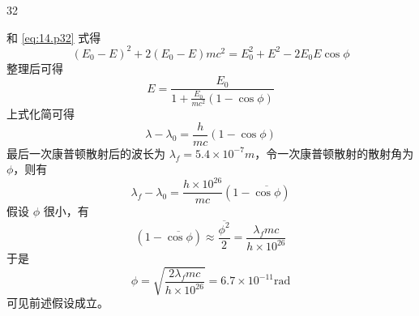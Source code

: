 \begin{solution}{32}
\begin{subsolution}
    和 \eqref{eq:14.p32} 式得
    \begin{equation}
      (E_{0} - E)^{2} + 2 (E_{0} - E) m c^{2} = E_{0}^{2} + E^{2} - 2 E_{0} E \cos \phi
    \end{equation}
    整理后可得
    \begin{equation}
      E = \frac{E_{0}}{1 + \frac{E_{0}}{m c^{2}} (1 - \cos \phi)}
      \label{eq:18.p32}
    \end{equation}
    上式化简可得
    \begin{equation}
      \lambda - \lambda_{0} = \frac{h}{m c} (1 - \cos \phi)
      \label{eq:19.p32}
    \end{equation}
    最后一次康普顿散射后的波长为 $\lambda_{f}=5.4\times10^{-7}m$，令一次康普顿散射的散射角为 $\phi$，则有
    \begin{equation}
      \lambda_{f} - \lambda_{0} = \frac{h \times 10^{26}}{m c} (1 - \overline{\cos \phi})
      \label{eq:20.p32}
    \end{equation}
    假设 $\phi$ 很小，有
    \begin{equation}
      (1 - \overline{\cos \phi}) \approx \frac{\overline{\phi^{2}}}{2} = \frac{\lambda_{f} m c}{h \times 10^{26}}
    \end{equation}
    于是
    \begin{equation}
      \phi = \sqrt{\frac{2 \lambda_{f} m c}{h \times 10^{26}}} = 6.7 \times 10^{-11} \mathrm{rad}
      \label{eq:21.p32}
    \end{equation}
    可见前述假设成立。
  \end{subsolution}
\end{solution}